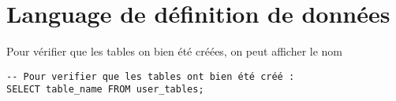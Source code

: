 \documentclass[10pt, oneside]{article}
\begin{document}
\section{Language de définition de données}



Pour vérifier que les tables on bien été créées, on peut afficher le nom

\begin{lstlisting}
-- Pour verifier que les tables ont bien été créé :
SELECT table_name FROM user_tables;
\end{lstlisting}
\end{document}
